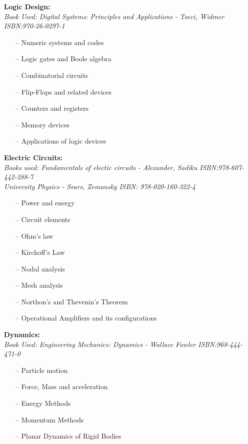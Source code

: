 \documentclass{article}
\begin{document}
\textbf{Logic Design:}\\
    \emph{Book Used: Digital Systems: Principles and Applications - Tocci, Widmer ISBN:970-26-0297-1}
    \begin{itemize}
     \setlength\itemsep{0pt}
    \item[--] Numeric systems and codes
    \item[--] Logic gates and Boole algebra
    \item[--] Combinatorial circuits
    \item[--] Flip-Flops and related devices
    \item[--] Counters and registers
    \item[--] Memory devices
    \item[--] Applications of logic devices
    \end{itemize}

\textbf{Electric Circuits:}\\
    \emph{Books used: Fundamentals of electic circuits - Alexander, Sadiku ISBN:978-607-442-288-7}\\
    \emph{University Physics - Sears, Zemansky ISBN: 978-020-160-322-4}
    \begin{itemize}
     \setlength\itemsep{0pt}
    \item[--] Power and energy
    \item[--] Circuit elements
    \item[--] Ohm's law
    \item[--] Kirchoff's Law
    \item[--] Nodal analysis
    \item[--] Mesh analysis
    \item[--] Northon's and Thevenin's Theorem
    \item[--] Operational Amplifiers and its configurations
    \end{itemize}

\textbf{Dynamics:}\\
    \emph{Book Used: Engineering Mechanics: Dynamics - Wallace Fowler ISBN:968-444-471-0  }
    \begin{itemize}
     \setlength\itemsep{0pt}
      \item[--] Particle motion
      \item[--] Force, Mass and acceleration
      \item[--] Energy Methods
      \item[--] Momentum Methods
      \item[--] Planar Dynamics of Rigid Bodies
    \end{itemize}
 
\end{document}
